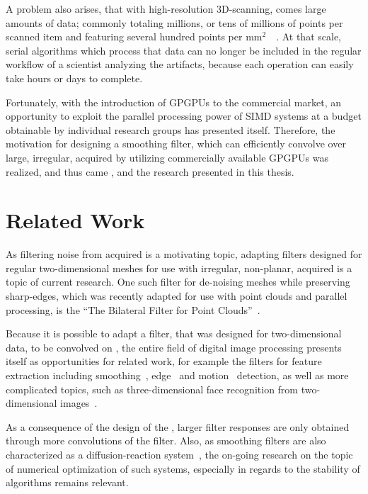 A problem also arises, that with high-resolution 3D-scanning, comes large amounts of data; commonly totaling millions, or tens of millions of points per scanned item and featuring several hundred points per mm$^2$~\cite[25,144]{Mara17}~\cite[4]{ILATO14}. At that scale, serial algorithms which process that data can no longer be included in the regular workflow of a scientist analyzing the artifacts, because each operation can easily take hours or days to complete.


Fortunately, with the introduction of \glspl{GPGPU} to the commercial market, an opportunity to exploit the parallel processing power of \gls{SIMD} systems at a budget obtainable by individual research groups has presented itself. Therefore, the motivation for designing a smoothing filter, which can efficiently convolve over large, irregular, acquired \tdd{} by utilizing commercially available GPGPUs was realized, and thus came , and the research presented in this thesis.

%
%
%
%
%
%
\section{Related Work}
As filtering noise from acquired \tdd{} is a motivating topic, adapting filters designed for regular two-dimensional meshes for use with irregular, non-planar, acquired \tdd{} is a topic of current research. One such filter for de-noising meshes while preserving sharp-edges, which was recently adapted for use with point clouds and parallel processing, is the ``The Bilateral Filter for Point Clouds''~\cite{Digne17}. 

Because it is possible to adapt a filter, that was designed for two-dimensional data, to be convolved on \tdd{}, the entire field of digital image processing presents itself as opportunities for related work, for example the filters for feature extraction including smoothing~\cite[299]{Jaehne97}, edge~\cite[331]{Jaehne97} and motion~\cite[397]{Jaehne97} detection, as well as more complicated topics, such as three-dimensional face recognition from two-dimensional images~\cite{faceRecog19}.

As a consequence of the design of the , larger filter responses are only obtained through more convolutions of the filter. Also, as smoothing filters are also characterized as a diffusion-reaction system~\cite[474]{Jaehne97}, the on-going research on the topic of numerical optimization of such systems, especially in regards to the stability of algorithms remains relevant.

